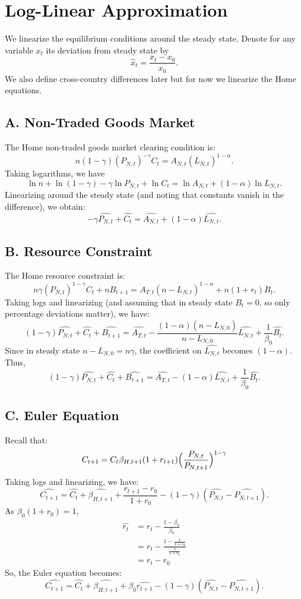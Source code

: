 \documentclass[a4paper,12pt]{article} %
\theoremstyle{nonitalic}
\begin{document}
\section{Log-Linear Approximation}
We linearize the equilibrium conditions around the steady state. Denote for any variable $x_t$ its deviation from steady state by
\[
\hat{x}_t = \frac{x_t-x_0}{x_0}.
\]
We also define cross-country differences later but for now we linearize the Home equations.

\subsection*{A. Non-Traded Goods Market}
The Home non-traded goods market clearing condition is:
\[
n(1-\gamma)(P_{N,t})^{-\gamma}C_t = A_{N,t}(L_{N,t})^{1-\alpha}.
\]
Taking logarithms, we have
\[
\ln n + \ln(1-\gamma) - \gamma\ln P_{N,t} + \ln C_t = \ln A_{N,t} + (1-\alpha)\ln L_{N,t}.
\]
Linearizing around the steady state (and noting that constants vanish in the difference), we obtain:
\[
\boxed{-\gamma  \widehat{P_{N,t}} + \widehat{C_t} =  \widehat{A_{N,t}} + (1-\alpha)  \widehat{L_{N,t}}. \tag{7a}}
\]

\subsection*{B. Resource Constraint}
The Home resource constraint is:
\[
n\gamma (P_{N,t})^{1-\gamma}C_t + nB_{t+1} = A_{T,t}(n-L_{N,t})^{1-\alpha}+ n(1+r_t)B_t.
\]
Taking logs and linearizing (and assuming that in steady state $B_t=0$, so only percentage deviations matter), we have:
\[
(1-\gamma)  \widehat{P_{N,t}} + \widehat{C_t} + \widehat{B_{t+1}} = \widehat{A_{T,t}} - \frac{(1-\alpha)(n-L_{N,0})}{n-L_{N,0}}  \widehat{L_{N,t}} + \frac{1}{\beta_0} \widehat{B_t}.
\]
Since in steady state $n-L_{N,0}= n\gamma$, the coefficient on $ \widehat{L_{N,t}}$ becomes $(1-\alpha)$. Thus,
\[
\boxed{(1-\gamma)  \widehat{P_{N,t}} + \widehat{C_t} + \widehat{B_{t+1}} = \widehat{A_{T,t}} - (1-\alpha)  \widehat{L_{N,t}} + \frac{1}{\beta_0} \widehat{B_t}. \tag{7c}}
\]

\subsection*{C. Euler Equation}
Recall that:
\[
C_{t+1} = C_t \beta_{H, t+1}(1+r_{t+1})\Bigl(\frac{P_{N,t}}{P_{N,t+1}}\Bigr)^{1-\gamma}
\]
Taking logs and linearizing, we have:
\[
\widehat{C_{t+1}} = \widehat{C_t} + \widehat{\beta_{H,t+1}} + \frac{r_{t+1}-r_0}{1+r_0} - (1-\gamma)( \widehat{P_{N,t}}- \widehat{P_{N,t+1}}).
\]
As $\beta_0(1+r_0) = 1$,
\begin{align*}
    \widehat{r_t} &= r_t - \frac{1-\beta_0}{\beta_0} \\
    &= r_t - \frac{1-\frac{1}{1+r_0}}{\frac{1}{1+r_0}} \\
    &= r_t - r_0
\end{align*}
So, the Euler equation becomes:
\[
\boxed{\widehat{C_{t+1}} = \widehat{C_t} + \widehat{\beta_{H,t+1}} + \beta_0  \widehat{r_{t+1}} - (1-\gamma)( \widehat{P_{N,t}}- \widehat{P_{N,t+1}}). \tag{7e}}
\]
\end{document}
